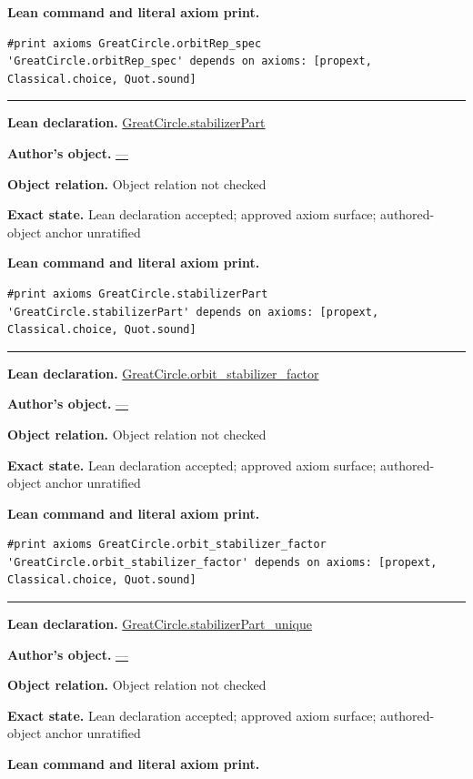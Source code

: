 \documentclass[11pt]{article}
\theoremstyle{plain}
\theoremstyle{definition}
\theoremstyle{remark}
\begin{document}
\begin{tcolorbox}
\par\smallskip\textbf{Lean command and literal axiom print.}
\begin{Verbatim}[breaklines=true,breakanywhere=true,fontsize=\small]
#print axioms GreatCircle.orbitRep_spec
'GreatCircle.orbitRep_spec' depends on axioms: [propext, Classical.choice, Quot.sound]
\end{Verbatim}
\medskip\hrule\medskip
\textbf{Lean declaration.} \url{GreatCircle.stabilizerPart}
\par\textbf{Author's object.} \url{—}
\par\textbf{Object relation.} Object relation not checked
\par\textbf{Exact state.} Lean declaration accepted; approved axiom surface; authored-object anchor unratified
\par\smallskip\textbf{Lean command and literal axiom print.}
\begin{Verbatim}[breaklines=true,breakanywhere=true,fontsize=\small]
#print axioms GreatCircle.stabilizerPart
'GreatCircle.stabilizerPart' depends on axioms: [propext, Classical.choice, Quot.sound]
\end{Verbatim}
\medskip\hrule\medskip
\textbf{Lean declaration.} \url{GreatCircle.orbit_stabilizer_factor}
\par\textbf{Author's object.} \url{—}
\par\textbf{Object relation.} Object relation not checked
\par\textbf{Exact state.} Lean declaration accepted; approved axiom surface; authored-object anchor unratified
\par\smallskip\textbf{Lean command and literal axiom print.}
\begin{Verbatim}[breaklines=true,breakanywhere=true,fontsize=\small]
#print axioms GreatCircle.orbit_stabilizer_factor
'GreatCircle.orbit_stabilizer_factor' depends on axioms: [propext, Classical.choice, Quot.sound]
\end{Verbatim}
\medskip\hrule\medskip
\textbf{Lean declaration.} \url{GreatCircle.stabilizerPart_unique}
\par\textbf{Author's object.} \url{—}
\par\textbf{Object relation.} Object relation not checked
\par\textbf{Exact state.} Lean declaration accepted; approved axiom surface; authored-object anchor unratified
\par\smallskip\textbf{Lean command and literal axiom print.}
\begin{Verbatim}[breaklines=true,breakanywhere=true,fontsize=\small]

\end{Verbatim}
\end{tcolorbox}
\end{document}
